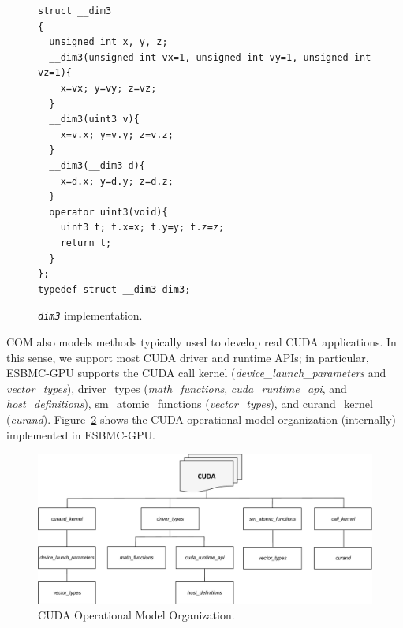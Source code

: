 \documentclass[times, doublespace]{cpeauth}
\begin{document}
\begin{figure} [htb]
\centering
\begin{minipage}{0.95\textwidth}
\begin{lstlisting}
struct __dim3
{
  unsigned int x, y, z;
  __dim3(unsigned int vx=1, unsigned int vy=1, unsigned int vz=1){
  	x=vx; y=vy; z=vz;
  }
  __dim3(uint3 v){
  	x=v.x; y=v.y; z=v.z;
  }
  __dim3(__dim3 d){
  	x=d.x; y=d.y; z=d.z;
  }
  operator uint3(void){
  	uint3 t; t.x=x; t.y=y; t.z=z;
	return t;
  }
};
typedef struct __dim3 dim3;
\end{lstlisting}
\end{minipage}
\caption{\emph{\tt dim3} implementation.}
\label{fig:dim3_implementation}
\end{figure}

COM also models methods typically used to develop real CUDA applications. In this sense, we support most CUDA driver and runtime APIs; in particular, ESBMC-GPU supports the CUDA call kernel (\textit{device\_launch\_parameters} and \textit{vector\_types}), driver\_types (\textit{math\_functions}, \textit{cuda\_runtime\_api}, and \textit{host\_definitions}), sm\_atomic\_functions (\textit{vector\_types}), and curand\_kernel (\textit{curand}). Figure~\ref{figure:comOrganization} shows the CUDA operational model organization (internally) implemented in ESBMC-GPU.

\begin{figure}[htb]
\centering
\includegraphics[width=130mm]{images/com.pdf}
\caption{CUDA Operational Model Organization.}
\label{figure:comOrganization}
\end{figure}
\end{document}
